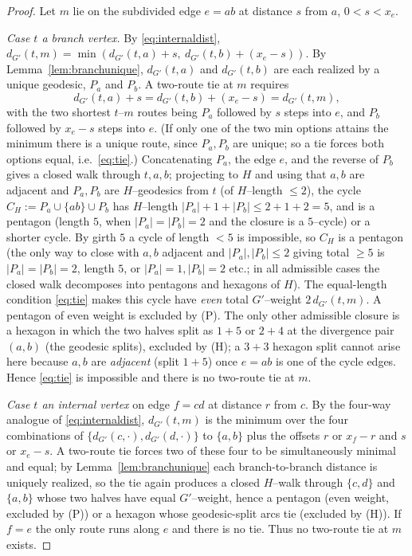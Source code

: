 \documentclass{amsart}
\theoremstyle{definition}
\begin{document}
\begin{proof}
Let $m$ lie on the subdivided edge $e=ab$ at distance $s$ from $a$, $0<s<x_e$.

\emph{Case $t$ a branch vertex.} By \eqref{eq:internaldist},
$d_{G'}(t,m)=\min(d_{G'}(t,a)+s,\ d_{G'}(t,b)+(x_e-s))$. By
Lemma~\ref{lem:branchunique}, $d_{G'}(t,a)$ and $d_{G'}(t,b)$ are each realized
by a unique geodesic, $P_a$ and $P_b$. A two-route tie at $m$ requires
\begin{equation}\label{eq:tie}
d_{G'}(t,a)+s=d_{G'}(t,b)+(x_e-s)=d_{G'}(t,m),
\end{equation}
with the two shortest $t$--$m$ routes being $P_a$ followed by $s$ steps into $e$,
and $P_b$ followed by $x_e-s$ steps into $e$. (If only one of the two min options
attains the minimum there is a unique route, since $P_a,P_b$ are unique; so a tie
forces both options equal, i.e.\ \eqref{eq:tie}.) Concatenating $P_a$, the edge
$e$, and the reverse of $P_b$ gives a closed walk through $t,a,b$; projecting to
$H$ and using that $a,b$ are adjacent and $P_a,P_b$ are $H$--geodesics from $t$
(of $H$--length $\le2$), the cycle $C_H:=P_a\cup\{ab\}\cup P_b$ has $H$--length
$|P_a|+1+|P_b|\le2+1+2=5$, and is a pentagon (length $5$, when
$|P_a|=|P_b|=2$ and the closure is a $5$--cycle) or a shorter cycle. By girth
$5$ a cycle of length $<5$ is impossible, so $C_H$ is a pentagon (the only way
to close with $a,b$ adjacent and $|P_a|,|P_b|\le2$ giving total $\ge5$ is
$|P_a|=|P_b|=2$, length $5$, or $|P_a|=1,|P_b|=2$ etc.; in all admissible cases
the closed walk decomposes into pentagons and hexagons of $H$). The equal-length
condition \eqref{eq:tie} makes this cycle have \emph{even} total $G'$--weight
$2\,d_{G'}(t,m)$. A pentagon of even weight is excluded by (P). The only other
admissible closure is a hexagon in which the two halves split as $1{+}5$ or
$2{+}4$ at the divergence pair $(a,b)$ (the geodesic splits), excluded by (H);
a $3{+}3$ hexagon split cannot arise here because $a,b$ are \emph{adjacent}
(split $1{+}5$) once $e=ab$ is one of the cycle edges. Hence \eqref{eq:tie} is
impossible and there is no two-route tie at $m$.

\emph{Case $t$ an internal vertex} on edge $f=cd$ at distance $r$ from $c$. By
the four-way analogue of \eqref{eq:internaldist},
$d_{G'}(t,m)$ is the minimum over the four combinations of
$\{d_{G'}(c,\cdot),d_{G'}(d,\cdot)\}$ to $\{a,b\}$ plus the offsets
$r$ or $x_f-r$ and $s$ or $x_e-s$. A two-route tie forces two of these four to
be simultaneously minimal and equal; by Lemma~\ref{lem:branchunique} each
branch-to-branch distance is uniquely realized, so the tie again produces a
closed $H$--walk through $\{c,d\}$ and $\{a,b\}$ whose two halves have equal
$G'$--weight, hence a pentagon (even weight, excluded by (P)) or a hexagon whose
geodesic-split arcs tie (excluded by (H)). If $f=e$ the only route runs along
$e$ and there is no tie. Thus no two-route tie at $m$ exists.
\end{proof}
\end{document}
